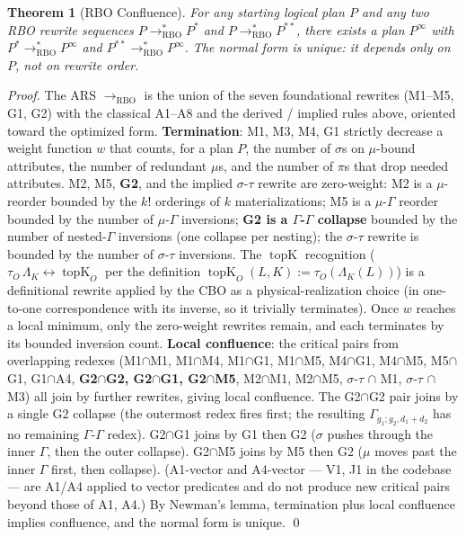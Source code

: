 \documentclass[sigconf,nonacm,review]{acmart}
\theoremstyle{plain}
\newtheorem{theorem}{Theorem}
\theoremstyle{definition}
\newcommand{\topK}{\operatorname{topK}}
\theoremstyle{remark}
\begin{document}
\begin{theorem}[RBO Confluence]\label{thm:rbo-confluence}
For any starting logical plan $P$ and any two RBO rewrite
sequences $P \to^*_{\mathrm{RBO}} P^*$ and
$P \to^*_{\mathrm{RBO}} P^{**}$, there exists a plan $P^\infty$
with $P^* \to^*_{\mathrm{RBO}} P^\infty$ and $P^{**}
\to^*_{\mathrm{RBO}} P^\infty$. The normal form is unique: it
depends only on $P$, not on rewrite order.
\end{theorem}

\begin{proof}
The ARS $\to_{\mathrm{RBO}}$ is the union of the seven
foundational rewrites (M1--M5, G1, G2) with the classical A1--A8
and the derived / implied rules above, oriented toward the
optimized form. \textbf{Termination}: M1, M3, M4, G1 strictly
decrease a weight function $w$ that counts, for a plan $P$,
the number of $\sigma$s on $\mu$-bound attributes, the number
of redundant $\mu$s, and the number of $\pi$s that drop needed
attributes. M2, M5, \textbf{G2}, and the implied $\sigma$-$\tau$
rewrite are zero-weight: M2 is a $\mu$-reorder bounded by the
$k!$ orderings of $k$ materializations; M5 is a
$\mu$-$\Gamma$ reorder bounded by the number of
$\mu$-$\Gamma$ inversions; \textbf{G2 is a $\Gamma$-$\Gamma$
collapse} bounded by the number of nested-$\Gamma$ inversions
(one collapse per nesting); the $\sigma$-$\tau$ rewrite is
bounded by the number of $\sigma$-$\tau$ inversions. The
$\topK$ recognition ($\tau_O\,\Lambda_K \leftrightarrow
\topK_O$ per the definition
$\topK_O(L, K) := \tau_O(\Lambda_K(L))$) is a definitional
rewrite applied by the CBO as a physical-realization choice
(in one-to-one correspondence with its inverse, so it
trivially terminates). Once $w$ reaches a local minimum,
only the zero-weight rewrites remain, and each terminates
by its bounded inversion count. \textbf{Local confluence}: the
critical pairs from overlapping redexes
(M1$\cap$M1, M1$\cap$M4, M1$\cap$G1, M1$\cap$M5,
M4$\cap$G1, M4$\cap$M5, M5$\cap$G1, G1$\cap$A4,
\textbf{G2$\cap$G2, G2$\cap$G1, G2$\cap$M5},
M2$\cap$M1, M2$\cap$M5, $\sigma$-$\tau$ $\cap$ M1,
$\sigma$-$\tau$ $\cap$ M3) all join by further rewrites,
giving local confluence. The G2$\cap$G2 pair joins by a
single G2 collapse (the outermost redex fires first; the
resulting $\Gamma_{g_1;g_2,d_1+d_2}$ has no remaining
$\Gamma$-$\Gamma$ redex). G2$\cap$G1 joins by G1 then G2
($\sigma$ pushes through the inner $\Gamma$, then the outer
collapse). G2$\cap$M5 joins by M5 then G2 ($\mu$ moves past
the inner $\Gamma$ first, then collapse). (A1-vector and
A4-vector --- V1, J1 in the codebase --- are A1/A4 applied to
vector predicates and do not produce new critical pairs beyond
those of A1, A4.) By Newman's lemma, termination plus
local confluence implies confluence, and the normal form is
unique. \qed
\end{proof}
\end{document}
